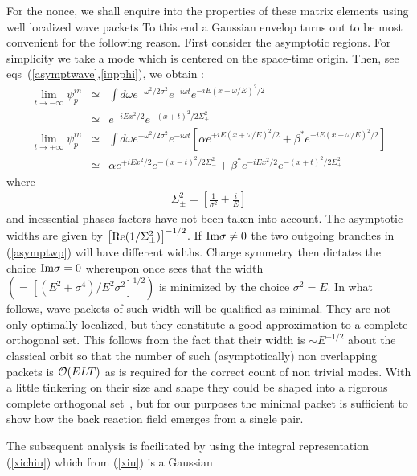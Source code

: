 \documentclass[12pt,oneside]{report}
\begin{document}
For the nonce, we shall enquire into the 
properties of these matrix elements
using well localized wave packets
 To this end a Gaussian envelop
turns out to be most convenient for the following reason. First consider the
asymptotic regions.  For simplicity we take a mode which is centered on the
space-time origin.  Then,
see eqs~(\ref{asymptwave},\ref{inpphi}), we obtain :
 \begin{eqnarray}
\lim_{t \to -\infty}
\psi^{in}_p & \simeq & \int d\omega e^{-\omega^2/2\sigma^2}
e^{-i \omega t} e^{-iE(x+\omega/E)^2/2} \nonumber \\
& \simeq & e^{-iEx^2/2} e^{-(x+t)^2/2 \Sigma^2_+}
\nonumber \\
\lim_{t \to +\infty} \psi^{in}_p & \simeq &
\int d\omega e^{-\omega^2/2\sigma^2} e^{-i \omega t}
\left[\alpha e^{+iE(x+\omega/E)^2/2} +
\beta ^* e^{-iE(x+\omega/E)^2/2} \right] \nonumber \\
& \simeq & \alpha e^{+iEx^2/2} e^{-(x-t)^2/2\Sigma^2_-}+
\beta ^* e^{-i Ex^2/2} e^{-(x+t)^2/2 \Sigma^2_+} \label{asymptwp}
\end{eqnarray}
where
\begin{eqnarray}
\Sigma^2_{\pm} = \left[ \frac{1}{\sigma^2} \pm \frac{i}{E} \right]
\label{Sigma}
\end{eqnarray}
and inessential phases factors have not been taken into account.
The asymptotic widths are given by $\left[{\rm Re} (1/\Sigma^2_{\pm})
\right]^{-1/2}$.  If ${\rm Im} \sigma \not= 0$ the two outgoing
branches in (\ref{asymptwp}) will have different widths. Charge symmetry
then dictates the choice ${\rm Im} \sigma = 0$ whereupon once sees
that the width $(= \left[(E^2 + \sigma^4)/E^2 \sigma^2 \right]^{1/2})$
is minimized by the choice $\sigma^2 = E$. In what follows, wave packets of such width
 will be qualified as minimal.  They are not only optimally
localized, but they constitute a good approximation to a complete
orthogonal set.  This follows from the fact that their width is
$\sim E^{-1/2}$ about the classical orbit so that the number of such 
(asymptotically) non overlapping packets is ${\cal O}(ELT)$ as is required for
the correct count of non trivial modes.  With a little tinkering
on their size and shape they could be shaped into a
rigorous complete orthogonal set~\cite{Meye}, but for our purposes the minimal
packet is sufficient to show how the back reaction field emerges from
a single pair.
\par The subsequent analysis is facilitated by using the integral
representation (\ref{xichiu}) which from (\ref{xiu}) is a Gaussian
\end{document}

